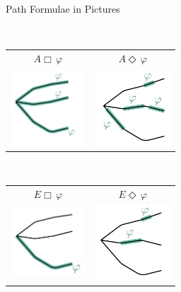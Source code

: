 \documentclass{beamer}
\begin{document}
\begin{slide}{Path Formulae in Pictures}
\centering

~\\
\begin{tabular}{cc}
  \Large $A \Box\, \varphi$ & \Large $A \Diamond \, \varphi$ \\
 \includegraphics[width=2.8cm]{./images/AA.jpg} &
 \hspace{1cm} \includegraphics[width=2.8cm]{./images/AE.jpg}
\end{tabular}

~\\[2mm]

\begin{tabular}{cc}
  \Large $E \Box\, \varphi$ & \Large $E \Diamond\, \varphi$ \\
 \includegraphics[width=2.8cm]{./images/EA.jpg} &   \hspace{1cm} \includegraphics[width=2.8cm]{./images/EE.jpg}
\end{tabular}
\end{slide}
\end{document}
